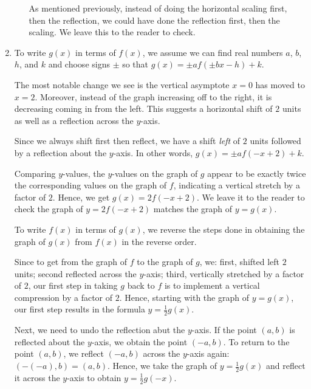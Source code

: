 \begin{ex}
\begin{enumerate}
\begin{enumerate}
As mentioned previously, instead of doing the horizontal scaling first, then the reflection, we could have done the reflection first, then the scaling.  We leave this to the reader to check.

 \end{enumerate}

 
 \item To write $g(x)$ in terms of $f(x)$, we assume we can find real numbers $a$, $b$, $h$, and $k$ and choose signs $\pm$ so that $g(x) = \pm a f(\pm b x - h)+k$.   
 
 \smallskip
 
 The most notable change we see is the vertical asymptote $x=0$ has moved to $x=2$.  Moreover, instead of the graph increasing off to the right, it is decreasing coming in from the left.  This suggests a horizontal shift of $2$ units as well as a reflection across the $y$-axis.  
 
 \smallskip
 
 Since we always shift first then reflect, we have a shift \textit{left} of $2$ units followed by a reflection about the $y$-axis.  In other words, $g(x) = \pm a f(-x+2) + k$.  
 
 \smallskip
 
 Comparing $y$-values, the $y$-values on the graph of $g$ appear to be exactly twice the corresponding values on the graph of $f$, indicating a vertical stretch by a factor of $2$.  Hence, we get $g(x) = 2 f(-x+2)$.  We leave it to the reader to check the graph of $y=2f(-x+2)$ matches the graph of $y=g(x)$.  
 
 \smallskip
 
To write $f(x)$ in terms of $g(x)$, we reverse the steps done in obtaining the graph of $g(x)$ from $f(x)$ in the reverse order.  

\smallskip

Since to get from the graph of $f$ to the graph of $g$, we: first, shifted left $2$ units; second reflected across the $y$-axis; third, vertically stretched by a factor of $2$, our first step in taking $g$ back to $f$ is to implement a vertical compression by a factor of $2$.  Hence, starting with the graph of $y=g(x)$, our first step results in the formula $y = \frac{1}{2} g(x)$. 

\smallskip

 Next, we need to undo the reflection abut the $y$-axis.  If the point $(a,b)$ is reflected about the $y$-axis, we obtain the point $(-a,b)$.  To return to the point $(a,b)$, we reflect $(-a,b)$ across the $y$-axis again: $(-(-a),b) = (a,b)$.  Hence, we take the graph of $y = \frac{1}{2} g(x)$ and reflect it across the $y$-axis to obtain $y = \frac{1}{2} g(-x)$.  
 

\end{enumerate}
\end{ex}
